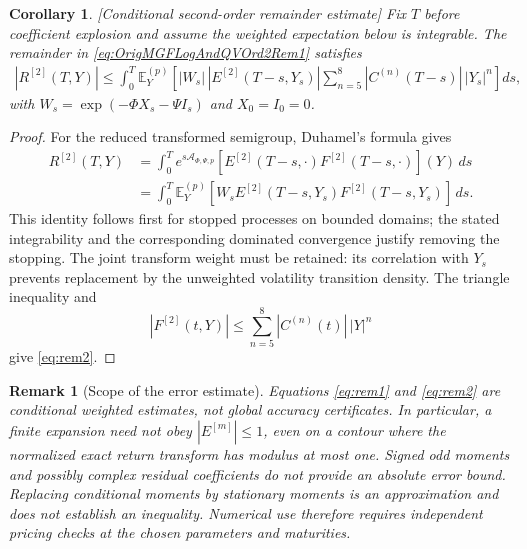 \documentclass[11pt,a4paper] {article}
\newtheorem{corollary}{Corollary}[section]
\newtheorem*{remark}{Remark}%
\begin{document}
\begin{corollary}\label{pr:ar2}[Conditional second-order remainder estimate]
Fix $T$ before coefficient explosion and assume the weighted expectation below
is integrable. The remainder in \eqref{eq:OrigMGFLogAndQVOrd2Rem1} satisfies
\begin{equation}\label{eq:rem2}
\begin{split}
|R^{[2]}(T,Y)|\leq\int_0^T\mathbb E_Y^{(p)}\!\left[
 |W_s|\,|E^{[2]}(T-s,Y_s)|
 \sum_{n=5}^8|C^{(n)}(T-s)|\,|Y_s|^n\right]ds,
\end{split}
\end{equation}
with $W_s=\exp(-\Phi X_s-\Psi I_s)$ and $X_0=I_0=0$.
\end{corollary}
\begin{proof}
For the reduced transformed semigroup, Duhamel's formula gives
\begin{equation}\label{eq:rtr1}
\begin{split}
R^{[2]}(T,Y)
&=\int_0^T e^{s\mathcal A_{\Phi,\Psi,p}}
      [E^{[2]}(T-s,\cdot)F^{[2]}(T-s,\cdot)](Y)\,ds\\
&=\int_0^T\mathbb E_Y^{(p)}\!
 [W_sE^{[2]}(T-s,Y_s)F^{[2]}(T-s,Y_s)]\,ds.
\end{split}
\end{equation}
This identity follows first for stopped processes on bounded domains; the stated
integrability and the corresponding dominated convergence justify removing the
stopping. The joint transform weight must be retained: its correlation with
$Y_s$ prevents replacement by the unweighted volatility transition density.
The triangle inequality and
\begin{equation}\label{eq:rt22}
|F^{[2]}(t,Y)|\leq\sum_{n=5}^8|C^{(n)}(t)|\,|Y|^n
\end{equation}
give \eqref{eq:rem2}.
\end{proof}
\begin{remark}[Scope of the error estimate]
Equations \eqref{eq:rem1} and \eqref{eq:rem2} are conditional weighted estimates,
not global accuracy certificates. In particular, a finite expansion need not
obey $|E^{[m]}|\leq1$, even on a contour where the normalized exact return
transform has modulus at most one. Signed odd moments and possibly complex
residual coefficients do not provide an absolute error bound. Replacing
conditional moments by stationary moments is an approximation and does not
establish an inequality. Numerical use therefore requires independent pricing
checks at the chosen parameters and maturities.
\end{remark}
\end{document}
